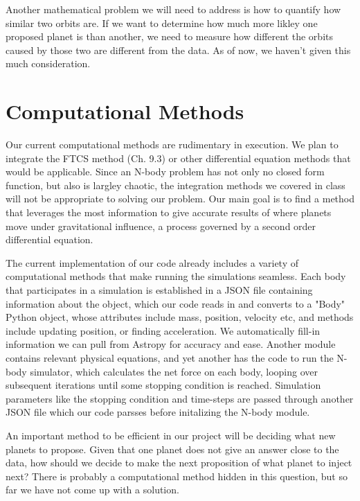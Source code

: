 \documentclass[a4paper,12pt]{article} %
\numberwithin{equation}{section} %
\numberwithin{figure}{section} %
\begin{document}
Another mathematical problem we will need to address is how to quantify how similar two orbits are. If we want to determine how much more likley one proposed planet is than another, we need to measure how different the orbits caused by those two are different from the data. As of now, we haven't given this much consideration.

\section{Computational Methods}


Our current computational methods are rudimentary in execution. We plan to integrate the FTCS method (Ch. 9.3) or other differential equation methods that would be applicable. Since an N-body problem has not only no closed form function, but also is largley chaotic, the integration methods we covered in class will not be appropriate to solving our problem. Our main goal is to find a method that leverages the most information to give accurate results of where planets move under gravitational influence, a process governed by a second order differential equation.
\par
The current implementation of our code already includes a variety of computational methods that make running the simulations seamless.
Each body that participates in a simulation is established in a JSON file containing information about the object, which our code reads in and converts to a "Body" Python object, whose attributes include mass, position, velocity etc, and methods include updating position, or finding acceleration. We automatically fill-in information we can pull from Astropy for accuracy and ease. Another module contains relevant physical equations, and yet another has the code to run the N-body simulator, which calculates the net force on each body, looping over subsequent iterations until some stopping condition is reached. Simulation parameters like the stopping condition and time-steps are passed through another JSON file which our code parsses before initalizing the N-body module.
\par
An important method to be efficient in our project will be deciding what new planets to propose. Given that one planet does not give an answer close to the data, how should we decide to make the next proposition of what planet to inject next? There is probably a computational method hidden in this question, but so far we have not come up with a solution.
\end{document}
